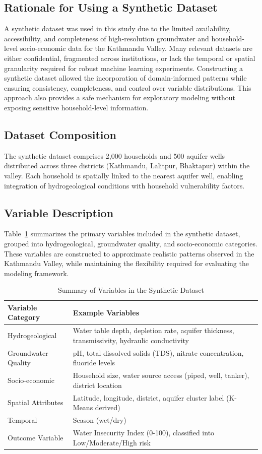 \documentclass[conference]{IEEEtran}
\begin{document}
\subsection{Rationale for Using a Synthetic Dataset}
A synthetic dataset was used in this study due to the limited availability, accessibility, and completeness of high-resolution groundwater and household-level socio-economic data for the Kathmandu Valley. Many relevant datasets are either confidential, fragmented across institutions, or lack the temporal or spatial granularity required for robust machine learning experiments. Constructing a synthetic dataset allowed the incorporation of domain-informed patterns while ensuring consistency, completeness, and control over variable distributions. This approach also provides a safe mechanism for exploratory modeling without exposing sensitive household-level information.

\subsection{Dataset Composition}
The synthetic dataset comprises 2,000 households and 500 aquifer wells distributed across three districts (Kathmandu, Lalitpur, Bhaktapur) within the valley. Each household is spatially linked to the nearest aquifer well, enabling integration of hydrogeological conditions with household vulnerability factors.

\subsection{Variable Description}
Table~\ref{tab:variables} summarizes the primary variables included in the synthetic dataset, grouped into hydrogeological, groundwater quality, and socio-economic categories. These variables are constructed to approximate realistic patterns observed in the Kathmandu Valley, while maintaining the flexibility required for evaluating the modeling framework.

\begin{table}[H]
\centering
\caption{Summary of Variables in the Synthetic Dataset}
\label{tab:variables}
\begin{tabular}{|p{3.2cm}|p{4.8cm}|}
\hline
\textbf{Variable Category} & \textbf{Example Variables} \\
\hline
Hydrogeological & Water table depth, depletion rate, aquifer thickness, transmissivity, hydraulic conductivity \\
\hline
Groundwater Quality & pH, total dissolved solids (TDS), nitrate concentration, fluoride levels \\
\hline
Socio-economic & Household size, water source access (piped, well, tanker), district location \\
\hline
Spatial Attributes & Latitude, longitude, district, aquifer cluster label (K-Means derived) \\
\hline
Temporal & Season (wet/dry) \\
\hline
Outcome Variable & Water Insecurity Index (0-100), classified into Low/Moderate/High risk \\
\hline
\end{tabular}
\end{table}
\end{document}
